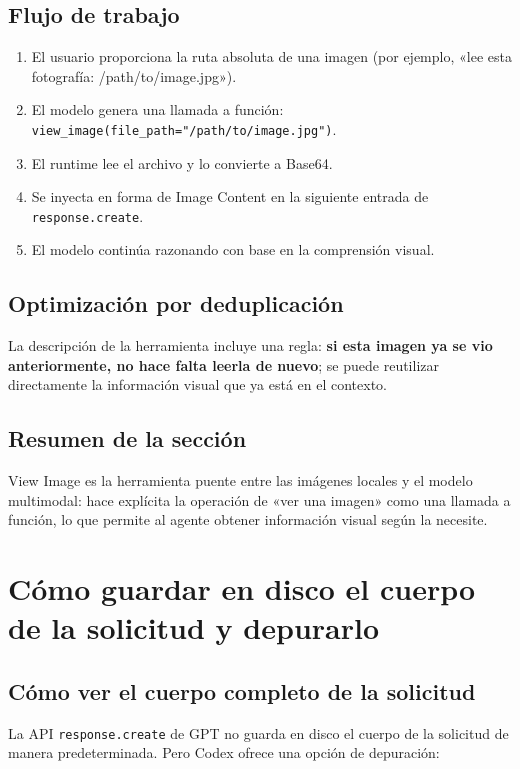 \documentclass[a4paper]{article}
\begin{document}
\subsection{Flujo de trabajo}

\begin{enumerate}
    \item El usuario proporciona la ruta absoluta de una imagen (por ejemplo, «lee esta fotografía: /path/to/image.jpg»).
    \item El modelo genera una llamada a función: \texttt{view\_image(file\_path="/path/to/image.jpg")}.
    \item El runtime lee el archivo y lo convierte a Base64.
    \item Se inyecta en forma de Image Content en la siguiente entrada de \texttt{response.create}.
    \item El modelo continúa razonando con base en la comprensión visual.
\end{enumerate}

\subsection{Optimización por deduplicación}

La descripción de la herramienta incluye una regla: \textbf{si esta imagen ya se vio anteriormente, no hace falta leerla de nuevo}; se puede reutilizar directamente la información visual que ya está en el contexto.

\subsection{Resumen de la sección}

View Image es la herramienta puente entre las imágenes locales y el modelo multimodal: hace explícita la operación de «ver una imagen» como una llamada a función, lo que permite al agente obtener información visual según la necesite.
\section{Cómo guardar en disco el cuerpo de la solicitud y depurarlo}

\subsection{Cómo ver el cuerpo completo de la solicitud}

La API \texttt{response.create} de GPT no guarda en disco el cuerpo de la solicitud de manera predeterminada. Pero Codex ofrece una opción de depuración:
\end{document}
